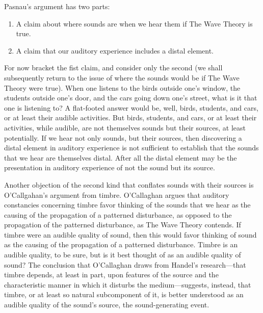 \documentclass[12pt]{article}
\begin{document}
Pasnau's argument has two parts:
\begin{enumerate}
	\item A claim about where sounds are when we hear them if The Wave Theory is true.
	\item A claim that our auditory experience includes a distal element.
\end{enumerate}
For now bracket the fist claim, and consider only the second (we shall subsequently return to the issue of where the sounds would be if The Wave Theory were true). When one listens to the birds outside one’s window, the students outside one’s door, and the cars going down one’s street, what is it that one is listening to? A flat-footed answer would be, well, birds, students, and cars, or at least their audible activities. But birds, students, and cars, or at least their activities, while audible, are not themselves sounds but their sources, at least potentially. If we hear not only sounds, but their sources, then discovering a distal element in auditory experience is not sufficient to establish that the sounds that we hear are themselves distal. After all the distal element may be the presentation in auditory experience of not the sound but its source.

Another objection of the second kind that conflates sounds with their sources is O’Callgahan’s \citeyearpar[89]{OCallaghan:2007xy} argument from timbre. O’Callaghan argues that auditory constancies concerning timbre favor thinking of the sounds that we hear as the causing of the propagation of a patterned disturbance, as opposed to the propagation of the patterned disturbance, as The Wave Theory contends. If timbre were an audible quality of sound, then this would favor thinking of sound as the causing of the propagation of a patterned disturbance. Timbre is an audible quality, to be sure, but is it best thought of as an audible quality of sound? The conclusion that O’Callaghan draws from Handel’s research---that timbre depends, at least in part, upon features of the source and the characteristic manner in which it disturbs the medium---suggests, instead, that timbre, or at least so natural subcomponent of it, is better understood as an audible quality of the sound’s source, the sound-generating event.
\end{document}
